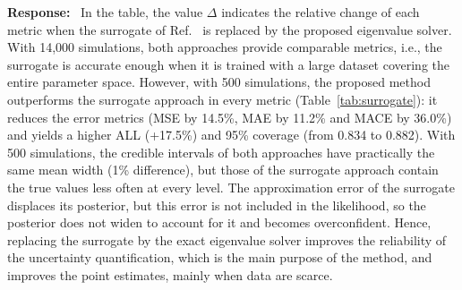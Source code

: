 \documentclass[11pt]{article}
\newenvironment{response}{\par\smallskip\noindent\color{resp}\textbf{Response:}\ }{\par}
\begin{document}
\begin{response}
In the table, the value $\Delta$ indicates the relative change of each metric when the surrogate of Ref.~\cite{Arxiv_Navamuel2026copula2d} is replaced by the proposed eigenvalue solver.
With 14,000 simulations, both approaches provide comparable metrics, i.e., the surrogate is accurate enough when it is trained with a large dataset covering the entire parameter space. 
However, with 500 simulations, the proposed method outperforms the surrogate approach in every metric (Table~\ref{tab:surrogate}): it reduces the error metrics (MSE by 14.5\%, MAE by 11.2\% and MACE by 36.0\%) and yields a higher ALL (+17.5\%) and 95\% coverage (from 0.834 to 0.882).
With 500 simulations, the credible intervals of both approaches have practically the same mean width (1\% difference), but those of the surrogate approach contain the true values less often at every level. 
The approximation error of the surrogate displaces its posterior, but this error is not included in the likelihood, so the posterior does not widen to account for it and becomes overconfident. 
Hence, replacing the surrogate by the exact eigenvalue solver improves the reliability of the uncertainty quantification, which is the main purpose of the method, and improves the point estimates, mainly when data are scarce.






\end{response}
\end{document}
